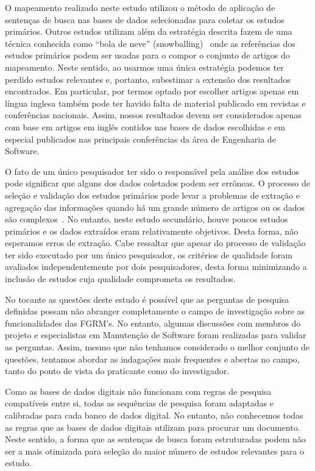 O mapeamento realizado neste estudo utilizou o método de aplicação de sentenças
de busca nas bases de dados selecionadas para coletar os estudos primários.
Outros estudos utilizam além da estratégia descrita fazem de uma técnica
conhecida  como ``bola de neve'' (snowballing)~\cite{wohlin2014guidelines} onde
as referências dos estudos primários podem ser usadas para o compor o conjunto
de artigos do mapeamento. Neste sentido, ao usarmos uma única estratégia podemos
ter perdido estudos relevantes e, portanto, subestimar a extensão dos resultados
encontrados. Em particular, por termos optado por escolher artigos apenas em
língua inglesa também pode ter havido falta de material publicado em revistas e
conferências nacionais. Assim, nossos resultados devem ser considerados apenas
com base em artigos em inglês contidos nas bases de dados escolhidas  e em
especial publicados nas principais conferências da área de Engenharia de
Software.

O fato de um único pesquisador ter sido o responsável pela análise dos estudos
pode significar que alguns dos dados coletados podem ser errôneas. O processo de
seleção e validação dos estudos primários pode levar a problemas de extração e
agregação das informações quando há um grande número de artigos ou os dados são
complexos~\cite{keele2007guidelines}. No entanto, neste estudo secundário, houve
poucos estudos primários e os dados extraídos eram relativamente objetivos.
Desta forma, não esperamos erros de extração. Cabe ressaltar que apesar do
processo de validação ter sido executado por um único pesquisador, os critérios
de qualidade foram avaliados independentemente por dois pesquisadores, desta
forma minimizando a inclusão de estudos cuja qualidade comprometa os resultados.

No tocante as questões deste estudo  é  possível que as perguntas de pesquisa
definidas possam não abranger completamente o campo de investigação sobre as
funcionalidades das FGRM's. No entanto, algumas discussões com membros do
projeto e especialistas em Manutenção de Software foram realizadas para validar
as perguntas. Assim, mesmo que não tenhamos considerado o melhor conjunto de
questões, tentamos abordar as indagações mais frequentes e abertas no campo,
tanto do ponto de vista do praticante como do investigador.

Como as bases de dados digitais não funcionam com regras de pesquisa compatíveis
entre si, todas as sequências de pesquisa foram adaptadas e calibradas para cada
banco de dados digital. No entanto, não conhecemos todas as regras que as bases
de dados digitais utilizam para procurar um documento. Neste sentido, a forma
que as sentenças de busca foram estruturadas podem não ser a mais otimizada para
seleção do maior número de estudos relevantes para o estudo.


